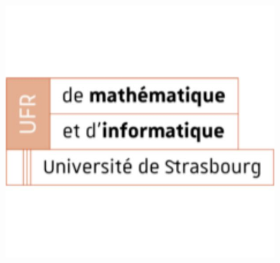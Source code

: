 \documentclass{beamer}
\begin{document}
\begin{frame}
\begin{figure}
\begin{minipage}{0.33\textwidth}
            \includegraphics[width=0.9\textwidth]{../image/logo-ufr-mathinfo-unistra-1.jpg}
        \end{minipage}
        
        \vspace{0.5cm} %
        

\end{figure}
\end{frame}
\end{document}
